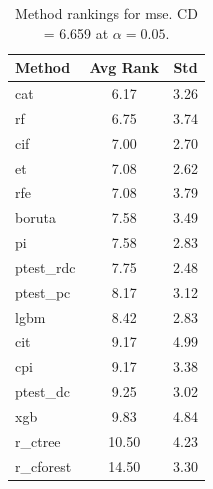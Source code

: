 \begin{table}[h]
\centering
\caption{Method rankings for mse. CD = 6.659 at $\alpha=0.05$.}
\label{tab:ranks_mse}
\begin{tabular}{lcc}
\toprule
Method & Avg Rank & Std \\
\midrule
cat & 6.17 & 3.26 \\
rf & 6.75 & 3.74 \\
cif & 7.00 & 2.70 \\
et & 7.08 & 2.62 \\
rfe & 7.08 & 3.79 \\
boruta & 7.58 & 3.49 \\
pi & 7.58 & 2.83 \\
ptest_rdc & 7.75 & 2.48 \\
ptest_pc & 8.17 & 3.12 \\
lgbm & 8.42 & 2.83 \\
cit & 9.17 & 4.99 \\
cpi & 9.17 & 3.38 \\
ptest_dc & 9.25 & 3.02 \\
xgb & 9.83 & 4.84 \\
r_ctree & 10.50 & 4.23 \\
r_cforest & 14.50 & 3.30 \\
\bottomrule
\end{tabular}
\end{table}